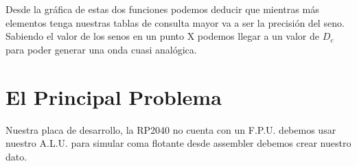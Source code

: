 \documentclass[]{article}
\begin{document}
Desde la gráfica de estas dos funciones podemos deducir que mientras más elementos tenga nuestras tablas de consulta mayor va a ser la precisión del seno.
Sabiendo el valor de los senos en un punto X podemos llegar a un valor de $D_{c}$ para poder generar una onda cuasi analógica.

\section*{El Principal Problema}
Nuestra placa de desarrollo, la RP2040 no cuenta con un F.P.U. debemos usar nuestro A.L.U. para simular coma flotante desde assembler debemos crear nuestro dato.
\end{document}
